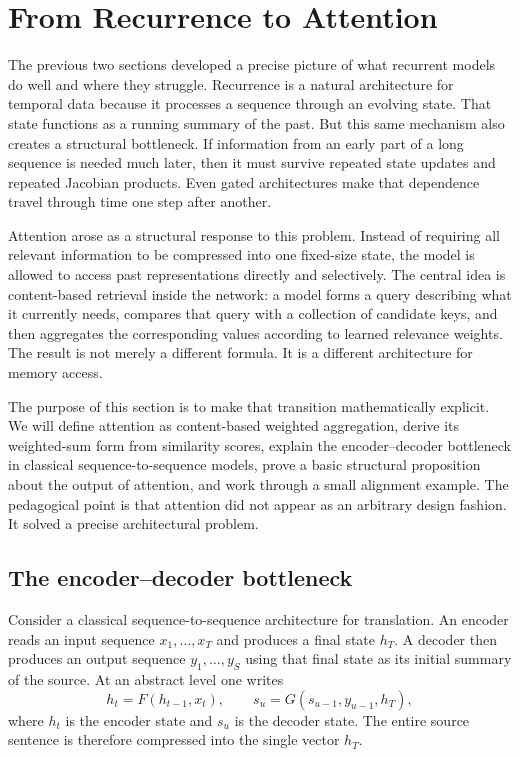 \section{From Recurrence to Attention}

The previous two sections developed a precise picture of what recurrent models do well and where they struggle.
Recurrence is a natural architecture for temporal data because it processes a sequence through an evolving state.
That state functions as a running summary of the past.
But this same mechanism also creates a structural bottleneck.
If information from an early part of a long sequence is needed much later, then it must survive repeated state updates and repeated Jacobian products.
Even gated architectures make that dependence travel through time one step after another.

\medskip

Attention arose as a structural response to this problem.
Instead of requiring all relevant information to be compressed into one fixed-size state, the model is allowed to access past representations directly and selectively.
The central idea is content-based retrieval inside the network: a model forms a query describing what it currently needs, compares that query with a collection of candidate keys, and then aggregates the corresponding values according to learned relevance weights.
The result is not merely a different formula.
It is a different architecture for memory access.

\medskip

The purpose of this section is to make that transition mathematically explicit.
We will define attention as content-based weighted aggregation, derive its weighted-sum form from similarity scores, explain the encoder--decoder bottleneck in classical sequence-to-sequence models, prove a basic structural proposition about the output of attention, and work through a small alignment example.
The pedagogical point is that attention did not appear as an arbitrary design fashion.
It solved a precise architectural problem.

\subsection*{The encoder--decoder bottleneck}

Consider a classical sequence-to-sequence architecture for translation.
An encoder reads an input sequence $x_1,\dots,x_T$ and produces a final state $h_T$.
A decoder then produces an output sequence $y_1,\dots,y_S$ using that final state as its initial summary of the source.
At an abstract level one writes
\[
 h_t = F(h_{t-1},x_t),
 \qquad
 s_u = G(s_{u-1},y_{u-1},h_T),
\]
where $h_t$ is the encoder state and $s_u$ is the decoder state.
The entire source sentence is therefore compressed into the single vector $h_T$.

